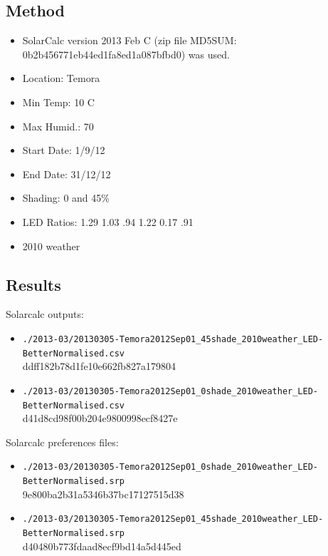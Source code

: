 \documentclass[12pt,a4paper]{book}
\begin{document}
    \subsection*{Method}
      \begin{itemize} \itemsep1pt \parskip0pt 
        \item SolarCalc version 2013 Feb C (zip file MD5SUM: 0b2b456771eb44ed1fa8ed1a087bfbd0) was
          used.
        \item Location: Temora
        \item Min Temp: 10 C
        \item Max Humid.: 70
        \item Start Date: 1/9/12
        \item End Date: 31/12/12
        \item Shading: 0 and 45\%
        \item LED Ratios: 1.29 1.03 .94 1.22 0.17 .91
        \item 2010 weather
      \end{itemize}
    \subsection*{Results}
      Solarcalc outputs:
      \begin{itemize} \itemsep1pt \parskip0pt 
          \item \verb+./2013-03/20130305-Temora2012Sep01_45shade_2010weather_LED-BetterNormalised.csv+\\
            ddff182b78d1fe10e662fb827a179804
          \item \verb+./2013-03/20130305-Temora2012Sep01_0shade_2010weather_LED-BetterNormalised.csv+\\
            d41d8cd98f00b204e9800998ecf8427e
      \end{itemize}
      Solarcalc preferences files:
      \begin{itemize} \itemsep1pt \parskip0pt 
          \item \verb+./2013-03/20130305-Temora2012Sep01_0shade_2010weather_LED-BetterNormalised.srp+\\
            9e800ba2b31a5346b37bc17127515d38
          \item \verb+./2013-03/20130305-Temora2012Sep01_45shade_2010weather_LED-BetterNormalised.srp+\\
            d40480b773fdaad8ecf9bd14a5d445ed
      \end{itemize}
\end{document}
